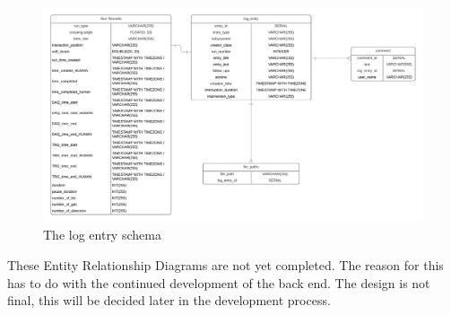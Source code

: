 \documentclass[paper=a4, fontsize=11pt,twoside]{scrartcl}	%
\begin{document}
\begin{figure}[h!]
\includegraphics[scale=0.5]{ERDLogEntry}
\caption{The log entry schema}
\end{figure}

These Entity Relationship Diagrams are not yet completed. The reason for this has to do with the continued development of the back end. The design is not final, this will be decided later in the development process. 
\end{document}
